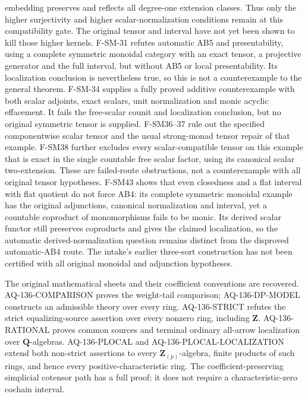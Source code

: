 \begin{description}[style=nextline,leftmargin=0pt]
embedding preserves and reflects all degree-one extension classes.
Thus only the higher surjectivity and higher scalar-normalization
conditions remain at this compatibility gate. The original tensor
and interval have not yet been shown to kill those higher kernels.
F-SM-31 refutes automatic AB5 and presentability,
using a complete symmetric monoidal category with an exact tensor,
a projective generator and the full interval, but without AB5 or
local presentability. Its localization conclusion is nevertheless
true, so this is not a counterexample to the general theorem.
F-SM-34 supplies a fully proved additive counterexample with both
scalar adjoints, exact scalars, unit normalization and monic acyclic
effacement. It fails the free-scalar counit and localization conclusion,
but no original symmetric tensor is supplied.
F-SM36--37 rule out the specified componentwise scalar tensor and
the usual strong-monad tensor repair of that example. F-SM38 further
excludes every scalar-compatible tensor on this example that is exact
in the single countable free scalar factor, using its canonical scalar
two-extension. These are
failed-route obstructions, not a counterexample with all original
tensor hypotheses.
F-SM43 shows that even closedness and a flat interval with flat
quotient do not force AB4: its complete symmetric monoidal example
has the original adjunctions, canonical normalization and interval,
yet a countable coproduct of monomorphisms fails to be monic.
Its derived scalar functor still preserves coproducts and gives the
claimed localization, so the automatic derived-normalization question
remains distinct from the disproved automatic-AB4 route.
The intake's earlier three-sort construction has not been certified
with all original monoidal and adjunction hypotheses.
\item[Cote 136, physical 111--121: the integral non-strict questions.]
The original mathematical sheets and their coefficient conventions
are recovered. AQ-136-COMPARISON proves the weight-tail comparison;
AQ-136-DP-MODEL constructs an admissible theory over every ring.
AQ-136-STRICT refutes the strict equalizing-source assertion over
every nonzero ring, including $\mathbf Z$.
AQ-136-RATIONAL proves common sources and terminal ordinary
all-arrow localization over $\mathbf Q$-algebras.
AQ-136-PLOCAL and AQ-136-PLOCAL-LOCALIZATION extend both non-strict
assertions to every $\mathbf Z_{(p)}$-algebra, finite products of such
rings, and hence every positive-characteristic ring.
The coefficient-preserving simplicial cotensor path has a full proof;
it does not require a characteristic-zero cochain interval.

\end{description}

